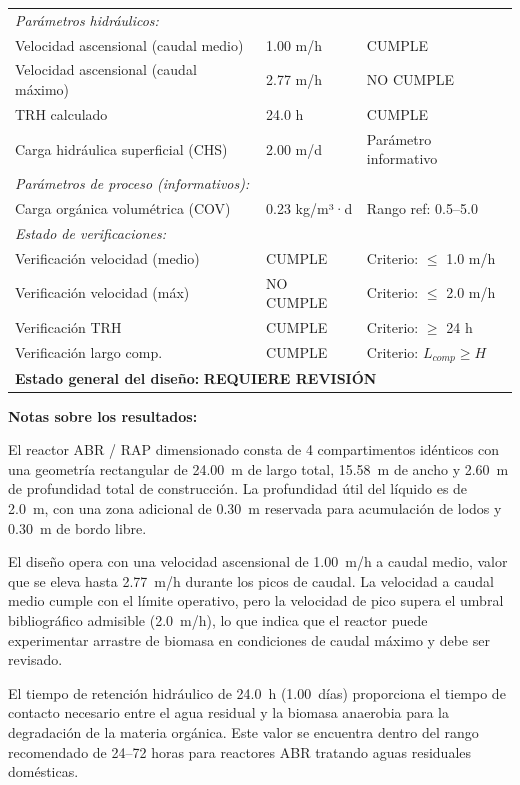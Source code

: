\documentclass[12pt,a4paper]{article}
\begin{document}
\begin{longtable}{p{6cm}p{3cm}p{5cm}}
\multicolumn{3}{l}{\textit{Parámetros hidráulicos:}} \\
Velocidad ascensional (caudal medio) & 1.00 m/h & CUMPLE \\
Velocidad ascensional (caudal máximo) & 2.77 m/h & NO CUMPLE \\
TRH calculado & 24.0 h & CUMPLE \\
Carga hidráulica superficial (CHS) & 2.00 m/d & Parámetro informativo \\
\midrule

\multicolumn{3}{l}{\textit{Parámetros de proceso (informativos):}} \\
Carga orgánica volumétrica (COV) & 0.23 kg/m³·d & Rango ref: 0.5--5.0 \\
\midrule

\multicolumn{3}{l}{\textit{Estado de verificaciones:}} \\
Verificación velocidad (medio) & CUMPLE & Criterio: $\leq$ 1.0 m/h \\
Verificación velocidad (máx) & NO CUMPLE & Criterio: $\leq$ 2.0 m/h \\
Verificación TRH & CUMPLE & Criterio: $\geq$ 24 h \\
Verificación largo comp. & CUMPLE & Criterio: $L_{comp} \geq H$ \\
\bottomrule
\multicolumn{3}{l}{\textbf{Estado general del diseño:} \textbf{REQUIERE REVISIÓN}} \\
\end{longtable}

\textbf{Notas sobre los resultados:}

El reactor ABR / RAP dimensionado consta de 4 compartimentos idénticos con una geometría rectangular de 24.00~m de largo total, 15.58~m de ancho y 2.60~m de profundidad total de construcción. La profundidad útil del líquido es de 2.0~m, con una zona adicional de 0.30~m reservada para acumulación de lodos y 0.30~m de bordo libre.

El diseño opera con una velocidad ascensional de 1.00~m/h a caudal medio, valor que se eleva hasta 2.77~m/h durante los picos de caudal. La velocidad a caudal medio cumple con el límite operativo, pero la velocidad de pico supera el umbral bibliográfico admisible (2.0~m/h), lo que indica que el reactor puede experimentar arrastre de biomasa en condiciones de caudal máximo y debe ser revisado.

El tiempo de retención hidráulico de 24.0~h (1.00~días) proporciona el tiempo de contacto necesario entre el agua residual y la biomasa anaerobia para la degradación de la materia orgánica. Este valor se encuentra dentro del rango recomendado de 24--72 horas para reactores ABR tratando aguas residuales domésticas.
\end{document}
